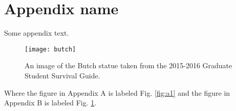 \section{Appendix name}

Some appendix text.
\begin{figure}[H] %
    \centering
    \texttt{[image: butch]}
    \caption{An image of the Butch statue taken from the 2015-2016 Graduate Student Survival Guide.}
    \label{fig:b1}
\end{figure} 

Where the figure in Appendix A is labeled Fig. \ref{fig:a1} and the figure in Appendix B is labeled Fig. \ref{fig:b1}.